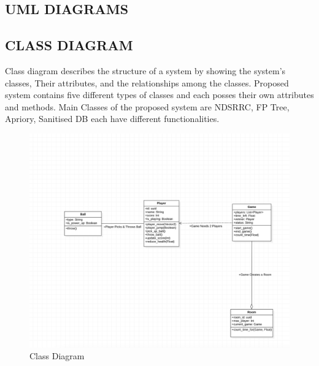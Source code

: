 \documentclass[12pt]{report}
\begin{document}
\raggedright
\subsection{UML DIAGRAMS}

\justifying
\setlength{\parindent}{4em}
\setlength{\parskip}{0.5em}
\renewcommand{\baselinestretch}{1.5}
\normalsize
\subsection{CLASS DIAGRAM}
Class diagram describes the structure of a system by showing the system’s classes, Their
attributes, and the relationships among the classes. Proposed system contains five different 
types of classes and each posses their own attributes and methods. Main Classes of the 
proposed system are NDSRRC, FP Tree, Apriory, Sanitised DB each have different 
functionalities.
\setlength{\parindent}{0em}
\setlength{\parskip}{0em}
\begin{figure}[h]
\centering
\includegraphics[scale=0.5]{Class.png}
\caption{ Class Diagram}
\label{ Class Diagram}
\end{figure}

\clearpage

\justifying
\setlength{\parindent}{4em}
\setlength{\parskip}{0.5em}
\renewcommand{\baselinestretch}{1.5}
\normalsize
\end{document}
